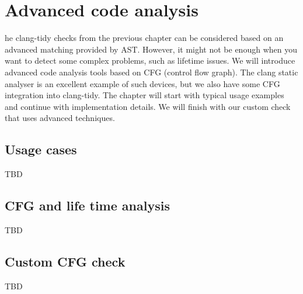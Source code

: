 \chapter{Advanced code analysis}
he clang-tidy checks from the previous chapter can be considered based on an
advanced matching provided by AST. However, it might not be enough when you want
to detect some complex problems, such as lifetime issues. We will introduce
advanced code analysis tools based on CFG (control flow graph). The clang static
analyser is an excellent example of such devices, but we also have some CFG
integration into clang-tidy. The chapter will start with typical usage examples
and continue with implementation details. We will finish with our custom check
that uses advanced techniques. 


\section{Usage cases}
TBD

\section{CFG and life time analysis}
TBD

\section{Custom CFG check}
TBD
